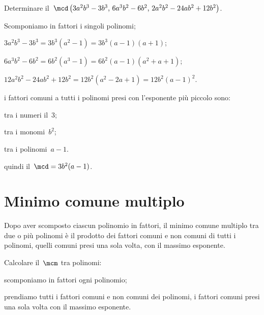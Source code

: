 \begin{exrig}
 \begin{esempio}
Determinare il~$\mcd\left(3a^{2}b^{3}-3b^{3}\text{,~}6a^{3}b^{2}-6b^{2}\text{,~}2a^{2}b^{2}-24ab^{2}+12b^{2}\right)$.
 \begin{itemize*}
 \item Scomponiamo in fattori i singoli polinomi;
  \begin{itemize*}
  \item $3a^{2}b^{3}-3b^{3}=3b^{3}\left(a^{2}-1\right)=3b^{3}(a-1)(a+1)$;
  \item $6a^{3}b^{2}-6b^{2}=6b^{2}\left(a^{3}-1\right)=6b^{2}(a-1)\left(a^{2}+a+1\right)$;
  \item $12a^{2}b^{2}-24ab^{2}+12b^{2}=12b^{2}\left(a^{2}-2a+1\right)=12b^{2}(a-1)^{2}$.
  \end{itemize*}
 \item i fattori comuni a tutti i polinomi presi con l'esponente più piccolo sono:
  \begin{itemize*}
  \item tra i numeri il~$3$;
  \item tra i monomi~$b^{2}$;
  \item tra i polinomi~$a-1$.
  \end{itemize*}
 \item quindi il~$\mcd=3b^{2}(a-1)$.
 \end{itemize*}
 \end{esempio}
\end{exrig}

\section{Minimo comune multiplo}
Dopo aver scomposto ciascun polinomio in fattori, il minimo comune multiplo tra due o più polinomi è il prodotto dei fattori comuni
e non comuni di tutti i polinomi, quelli comuni presi una sola volta, con il massimo esponente.

\begin{procedura}
Calcolare il~$\mcm$ tra polinomi:
\begin{enumeratea}
\item scomponiamo in fattori ogni polinomio;
\item prendiamo tutti i fattori comuni e non comuni dei polinomi, i fattori comuni presi una sola
   volta con il massimo esponente.
\end{enumeratea}
\end{procedura}

